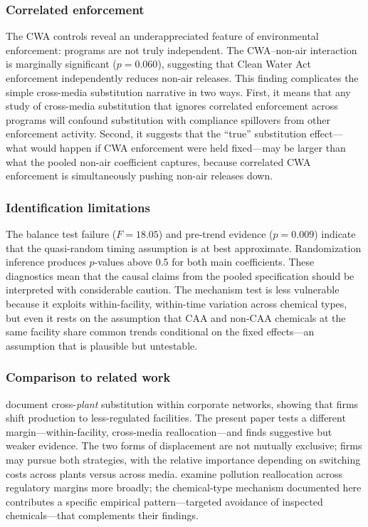 \documentclass[12pt]{article}
\begin{document}
\subsubsection*{Correlated enforcement} The CWA controls reveal an underappreciated feature of environmental enforcement: programs are not truly independent. The CWA--non-air interaction is marginally significant ($p = 0.060$), suggesting that Clean Water Act enforcement independently reduces non-air releases. This finding complicates the simple cross-media substitution narrative in two ways. First, it means that any study of cross-media substitution that ignores correlated enforcement across programs will confound substitution with compliance spillovers from other enforcement activity. Second, it suggests that the ``true'' substitution effect---what would happen if CWA enforcement were held fixed---may be larger than what the pooled non-air coefficient captures, because correlated CWA enforcement is simultaneously pushing non-air releases down.

\subsubsection*{Identification limitations} The balance test failure ($F = 18.05$) and pre-trend evidence ($p = 0.009$) indicate that the quasi-random timing assumption is at best approximate. Randomization inference produces $p$-values above 0.5 for both main coefficients. These diagnostics mean that the causal claims from the pooled specification should be interpreted with considerable caution. The mechanism test is less vulnerable because it exploits within-facility, within-time variation across chemical types, but even it rests on the assumption that CAA and non-CAA chemicals at the same facility share common trends conditional on the fixed effects---an assumption that is plausible but untestable.

\subsubsection*{Comparison to related work} \citet{rijal2020crossplant} document cross-\textit{plant} substitution within corporate networks, showing that firms shift production to less-regulated facilities. The present paper tests a different margin---within-facility, cross-media reallocation---and finds suggestive but weaker evidence. The two forms of displacement are not mutually exclusive; firms may pursue both strategies, with the relative importance depending on switching costs across plants versus across media. \citet{chenroth2023} examine pollution reallocation across regulatory margins more broadly; the chemical-type mechanism documented here contributes a specific empirical pattern---targeted avoidance of inspected chemicals---that complements their findings.
\end{document}

